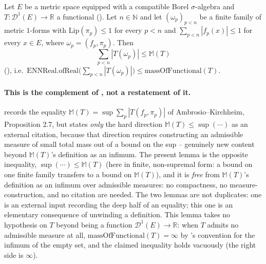 \begin{lemma}
  Let $E$ be a metric space equipped with a compatible Borel $\sigma$-algebra and $T \colon
  \mathcal{D}^1(E) \to \mathbb{R}$ a functional (). Let $n\in\mathbb{N}$ and let
  $(\omega_p)_{p<n}$ be a finite family of metric $1$-forms with $\mathrm{Lip}(\pi_p)\le 1$ for
  every $p<n$ and $\sum_{p<n}|f_p(x)|\le 1$ for every $x\in E$, where $\omega_p=(f_p,\pi_p)$. Then
  \[
    \sum_{p<n} |T(\omega_p)| \le \mathbb{M}(T)
  \]
  (), i.e.\ $\mathrm{ENNReal.ofReal}\bigl(\sum_{p<n}|T(\omega_p)|\bigr)
  \le \mathrm{massOfFunctional}(T)$.

  \paragraph{This is the complement of , not a restatement of it.}
   records the equality
  $\mathbb{M}(T) = \sup\sum_{p}|T(f_p,\pi_p)|$ of Ambrosio--Kirchheim, Proposition 2.7, but states
  \emph{only} the hard direction $\mathbb{M}(T)\le\sup(\cdots)$ as an external citation, because that
  direction requires constructing an admissible measure of small total mass out of a bound on the
  sup -- genuinely new content beyond $\mathbb{M}(T)$'s definition as an infimum. The present lemma
  is the opposite inequality, $\sup(\cdots)\le\mathbb{M}(T)$ (here in finite, non-supremal form:
  a bound on one finite family transfers to a bound on $\mathbb{M}(T)$), and it is \emph{free} from
  $\mathbb{M}(T)$'s definition as an infimum over admissible measures: no compactness, no
  measure-construction, and no citation are needed. The two lemmas are not duplicates: one is an
  external input recording the deep half of an equality; this one is an elementary consequence of
  unwinding a definition. This lemma takes no hypothesis on $T$ beyond being a function
  $\mathcal{D}^1(E)\to\mathbb{R}$: when $T$ admits no admissible measure at all,
  $\mathrm{massOfFunctional}(T)=\infty$ by 's convention for the infimum
  of the empty set, and the claimed inequality holds vacuously (the right side is $\infty$).
\end{lemma}
